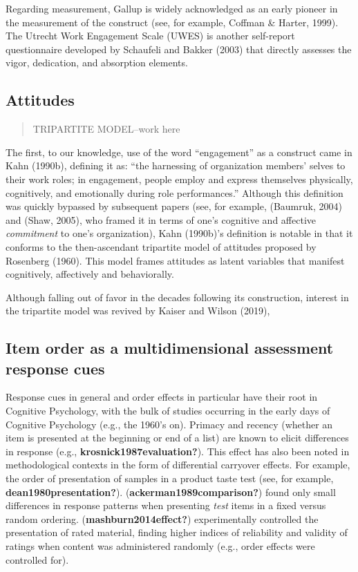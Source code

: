 \documentclass[
  man]{apa7}
\begin{document}
Regarding measurement, Gallup is widely acknowledged as an early pioneer in the measurement of the construct (see, for example, Coffman \& Harter, 1999). The Utrecht Work Engagement Scale (UWES) is another self-report questionnaire developed by Schaufeli and Bakker (2003) that directly assesses the vigor, dedication, and absorption elements.

\hypertarget{attitudes}{%
\subsection{Attitudes}\label{attitudes}}

\begin{quote}
TRIPARTITE MODEL--work here
\end{quote}

The first, to our knowledge, use of the word ``engagement'' as a construct came in Kahn (1990b), defining it as: ``the harnessing of organization members' selves to their work roles; in engagement, people employ and express themselves physically, cognitively, and emotionally during role performances.'' Although this definition was quickly bypassed by subsequent papers (see, for example, (Baumruk, 2004) and (Shaw, 2005), who framed it in terms of one's cognitive and affective \emph{commitment} to one's organization), Kahn (1990b)'s definition is notable in that it conforms to the then-ascendant tripartite model of attitudes proposed by Rosenberg (1960). This model frames attitudes as latent variables that manifest cognitively, affectively and behaviorally.

Although falling out of favor in the decades following its construction, interest in the tripartite model was revived by Kaiser and Wilson (2019),

\hypertarget{item-order-as-a-multidimensional-assessment-response-cues}{%
\subsection{Item order as a multidimensional assessment response cues}\label{item-order-as-a-multidimensional-assessment-response-cues}}

Response cues in general and order effects in particular have their root in Cognitive Psychology, with the bulk of studies occurring in the early days of Cognitive Psychology (e.g., the 1960's on). Primacy and recency (whether an item is presented at the beginning or end of a list) are known to elicit differences in response (e.g., \textbf{krosnick1987evaluation?}). This effect has also been noted in methodological contexts in the form of differential carryover effects. For example, the order of presentation of samples in a product taste test (see, for example, \textbf{dean1980presentation?}). (\textbf{ackerman1989comparison?}) found only small differences in response patterns when presenting \emph{test} items in a fixed versus random ordering. (\textbf{mashburn2014effect?}) experimentally controlled the presentation of rated material, finding higher indices of reliability and validity of ratings when content was administered randomly (e.g., order effects were controlled for).
\end{document}
